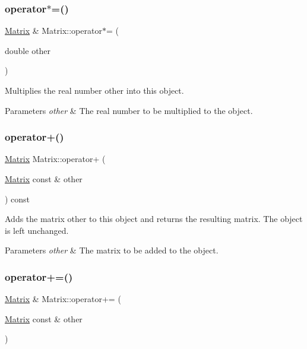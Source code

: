 \subsubsection{\texorpdfstring{operator$\ast$=()}{operator*=()}\hspace{0.1cm}{\footnotesize\ttfamily [2/2]}}
{\footnotesize\ttfamily \hyperlink{classMatrix}{Matrix} \& Matrix\+::operator$\ast$= (\begin{DoxyParamCaption}\item[{double}]{other }\end{DoxyParamCaption})}

Multiplies the real number {\ttfamily other} into this object.


\begin{DoxyParams}{Parameters}
{\em other} & The real number to be multiplied to the object. \\
\hline
\end{DoxyParams}
\mbox{\label{classMatrix_a2c888c6a7fe7a4ea3b603d17fe3f77e0}} 
\subsubsection{\texorpdfstring{operator+()}{operator+()}}
{\footnotesize\ttfamily \hyperlink{classMatrix}{Matrix} Matrix\+::operator+ (\begin{DoxyParamCaption}\item[{\hyperlink{classMatrix}{Matrix} const \&}]{other }\end{DoxyParamCaption}) const}

Adds the matrix {\ttfamily other} to this object and returns the resulting matrix. The object is left unchanged.


\begin{DoxyParams}{Parameters}
{\em other} & The matrix to be added to the object. \\
\hline
\end{DoxyParams}
\mbox{\label{classMatrix_a5f5d62f853a2ed97f2ba437036b1724d}} 
\subsubsection{\texorpdfstring{operator+=()}{operator+=()}}
{\footnotesize\ttfamily \hyperlink{classMatrix}{Matrix} \& Matrix\+::operator+= (\begin{DoxyParamCaption}\item[{\hyperlink{classMatrix}{Matrix} const \&}]{other }\end{DoxyParamCaption})}

